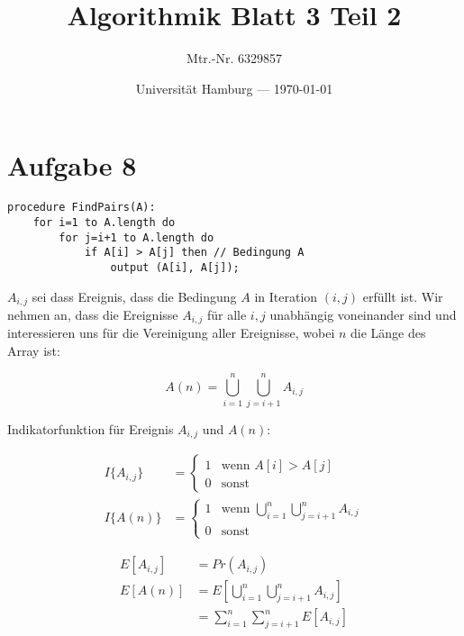 \documentclass[parskip=half,a4paper]{scrartcl}
\title{Algorithmik Blatt 3 Teil 2}
\author{Mtr.-Nr. 6329857}
\date{Universität Hamburg --- \today}
\begin{document}
\maketitle %

\linenumbers

\section*{Aufgabe 8}

\begin{verbatim}
procedure FindPairs(A):
    for i=1 to A.length do
        for j=i+1 to A.length do
            if A[i] > A[j] then // Bedingung A
                output (A[i], A[j]);
\end{verbatim}


$A_{i,j}$ sei dass Ereignis, dass die Bedingung $A$ in Iteration $(i,j)$ erfüllt ist. Wir nehmen an, dass die Ereignisse $A_{i,j}$ für alle $i,j$ unabhängig voneinander sind und interessieren uns für die Vereinigung aller Ereignisse, wobei $n$ die Länge des Array ist:

\begin{equation}
A(n) = \bigcup_{i=1}^{n}{\bigcup_{j=i+1}^n}A_{i,j}
\end{equation}

Indikatorfunktion für Ereignis $A_{i,j}$ und $A(n)$:

\begin{equation}
\begin{aligned}
I\{A_{i,j}\} &= \begin{cases}
1 & \text{wenn $A[i] > A[j]$}\\
0 & \text{sonst}
\end{cases}\\
I\{A(n)\} &= \begin{cases}
1 & \text{wenn $\bigcup_{i=1}^{n}{\bigcup_{j=i+1}^n}A_{i,j}$}\\
0 & \text{sonst}
\end{cases}
\end{aligned}
\end{equation}

\begin{equation}
\begin{aligned}
   E\left[A_{i,j}\right] &= Pr(A_{i,j})\\
   E\left[A(n)\right] &= E\left[\bigcup_{i=1}^n{\bigcup_{j=i+1}^n}A_{i,j}\right] \\
   &= \sum_{i=1}^n{\sum_{j=i+1}^n}E\left[A_{i,j}\right]
\end{aligned}
\end{equation}
\end{document}
